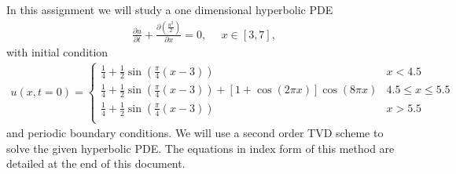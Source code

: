 In this assignment we will study a one dimensional hyperbolic PDE
\begin{align*}
\frac{\partial u}{\partial t}+\frac{\partial \left(\frac{u^2}{2}\right)}{\partial x}=0,~~~~~~x\in[3,7],
\end{align*}
with initial condition
\begin{align*}
u(x,t=0)=\left\{ \begin{array}{cc} 
	\frac{1}{4}+\frac{1}{2}\sin(\frac{\pi}{4}(x-3)) & x<4.5 \\
	\frac{1}{4}+\frac{1}{2}\sin(\frac{\pi}{4}(x-3))+\left[1+\cos(2\pi x)\right]\cos(8\pi x) & 4.5\leq x\leq 5.5 \\
	\frac{1}{4}+\frac{1}{2}\sin(\frac{\pi}{4}(x-3)) & x>5.5 \\
                \end{array} \right.
\end{align*}
and periodic boundary conditions. We will use a second order TVD scheme to solve the given hyperbolic PDE. The equations in index form of this method are detailed at the end of this document.
